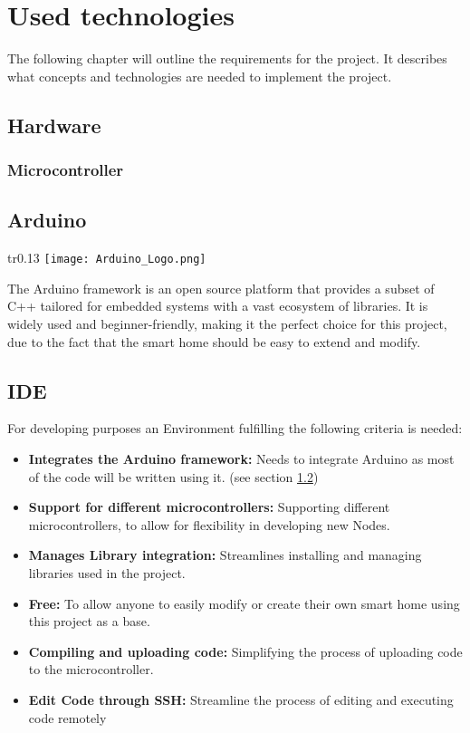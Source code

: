 \chapter{Used technologies} 
The following chapter will outline the requirements for the 
project. It describes what concepts and technologies are needed
to implement the project.
    \section{Hardware}
        \subsection{Microcontroller}
        
    \section{Arduino}\label{sec:arduino}
    \begin{wrapfigure}[2]{tr}{0.13\textwidth} %
        \vspace{-1.4cm}
        \hspace{3cm}
        \texttt{[image: Arduino\_Logo.png]}
    \end{wrapfigure}
    The Arduino framework is an open source platform that
    provides a subset of C++ tailored for embedded systems
    with a vast ecosystem of libraries. It is widely used
    and beginner-friendly, making it the perfect choice for
    this project, due to the fact that the smart home 
    should be easy to extend and modify.

    \section{IDE}
    For developing purposes an Environment fulfilling the following criteria is needed:
    \begin{itemize}[itemsep=0em]
        \item \textbf{Integrates the Arduino framework:}
        Needs to integrate Arduino as most of the code will be written using it. 
        (see section \ref{sec:arduino})
        \item \textbf{Support for different microcontrollers:}
        Supporting different microcontrollers, to allow for flexibility
        in developing new Nodes.
        \item \textbf{Manages Library integration:}
        Streamlines installing and managing libraries used in the project.
        \item \textbf{Free:}
        To allow anyone to easily modify  or create their own smart home
        using this project as a base.
        \item \textbf{Compiling and uploading code:} 
        Simplifying the process of uploading code to the microcontroller.
        \item \textbf{Edit Code through SSH:}
        Streamline the process of editing and executing code remotely
    \end{itemize} 
        \vspace{1cm}
